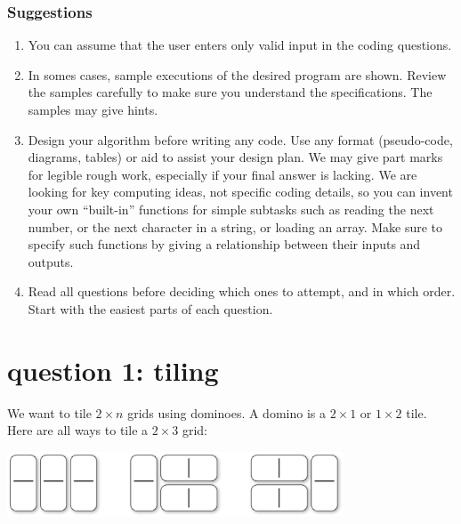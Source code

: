 \documentclass[12pt]{article}
\begin{document}
\subsubsection*{Suggestions}
\begin{enumerate}
\item You can assume that the user enters only valid input in the coding questions.
\item In somes cases, sample executions of the desired program are shown.
Review the samples carefully to make sure you understand 
the specifications. The samples may give hints. 
\item Design your algorithm before writing any code.
  Use any format (pseudo-code, diagrams, tables) or aid 
  to assist your design plan. 
  We may give part marks for legible rough work,
  especially if your final answer is lacking.
  We are looking for key computing ideas, not specific coding details, 
  so you can invent your own ``built-in'' 
  functions for simple subtasks such as reading
  the next number, or the next character in a string, or loading an
  array.  Make sure to specify such functions by giving a 
  relationship between their inputs and outputs. 
\item Read all questions before deciding which ones
  to attempt, and in which order.  Start with the easiest parts of
  each question.  
\end{enumerate}





\newpage
\section*{question 1: tiling}

We want to tile $2 \times n$ grids using dominoes.
A domino is a $2 \times 1$ or $1\times 2$ tile.
Here are all ways to tile a $2 \times 3$ grid:

\vspace{-3mm}
\begin{center}
\includegraphics[width=100mm]{Figures/23-tilings.eps}
\end{center}
\vspace{-5mm}
\end{document}
